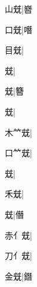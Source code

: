 \begin{multicols}{2}
{{\cjk{}{\cnsym{}　}山兓}\mktsJzrVerticalBar{}{\cjk{}{\cnsym{}　}{\cnsym{}　}{\cnsym{}　}}|{\cjk{}嶜}\par
{\cjk{}{\cnsym{}　}口兓}\mktsJzrVerticalBar{}{\cjk{}{\cnsym{}　}{\cnsym{}　}{\cnsym{}　}}|{\cjk{}噆}\par
{\cjk{}{\cnsym{}　}目兓}\mktsJzrVerticalBar{}{\cjk{}{\cnsym{}　}{\cnsym{}　}{\cnsym{}　}}|{}\par
{兓}\mktsJzrVerticalBar{}{\cjk{}{\cnsym{}　}{\cnsym{}　}{\cnsym{}　}}|{}\par
{兓}\mktsJzrVerticalBar{}{\cjk{}{\cnsym{}　}{\cnsym{}　}{\cnsym{}　}}|{\cjk{}簪}\par
{兓}\mktsJzrVerticalBar{}{\cjk{}{\cnsym{}　}{\cnsym{}　}{\cnsym{}　}}|{}\par
{\cjk{}木{\cnxb{}𥫗}兓}\mktsJzrVerticalBar{}{\cjk{}{\cnsym{}　}{\cnsym{}　}{\cnsym{}　}}|{}\par
{\cjk{}口{\cnxb{}𥫗}兓}\mktsJzrVerticalBar{}{\cjk{}{\cnsym{}　}{\cnsym{}　}{\cnsym{}　}}|{}\par
{兓}\mktsJzrVerticalBar{}{\cjk{}{\cnsym{}　}{\cnsym{}　}{\cnsym{}　}}|{}\par
{\cjk{}{\cnsym{}　}禾兓}\mktsJzrVerticalBar{}{\cjk{}{\cnsym{}　}{\cnsym{}　}{\cnsym{}　}}|{}\par
{兓}\mktsJzrVerticalBar{}{\cjk{}{\cnsym{}　}{\cnsym{}　}{\cnsym{}　}}|{\cjk{}僭}\par
{\cjk{}赤{亻}兓}\mktsJzrVerticalBar{}{\cjk{}{\cnsym{}　}{\cnsym{}　}{\cnsym{}　}}|{}\par
{\cjk{}刀{亻}兓}|{}\par
{\cjk{}{\cnsym{}　}金兓}\mktsJzrVerticalBar{}{\cjk{}{\cnsym{}　}{\cnsym{}　}{\cnsym{}　}}|{\cjk{}鐕}\par
}
\end{multicols}
